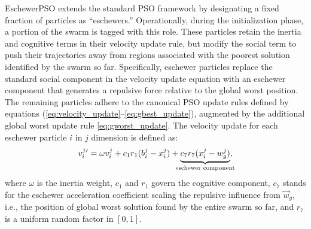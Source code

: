 {EschewerPSO extends the standard PSO framework by designating a fixed fraction of particles as ``eschewers.'' Operationally, during the initialization phase, a portion of the swarm is tagged with this role. These particles retain the inertia and cognitive terms in their velocity update rule, but modify the social term to push their trajectories away from regions associated with the poorest solution identified by the swarm so far.
Specifically, eschewer particles replace the standard social component in the velocity update equation with an eschewer component that generates a repulsive force relative to the global worst position. The remaining particles adhere to the canonical PSO update rules defined by equations (\ref{eq:velocity_update}–\ref{eq:gbest_update}), augmented by the additional global worst update rule \eqref{eq:gworst_update}. 
The velocity update for each eschewer particle $i$ in $j$ dimension is defined as:
\begin{equation}\label{eq:velocity_update_eschewer}
v_{i}^{j}{}' = \omega v_{i}^{j} +
c_1 r_1 (b_{i}^{j} - x_{i}^{j}) +
\underbrace{c_7 r_7 (x_{i}^{j} - w_{g}^{j})}_{\mathclap{\text{eschewer component}}},
\end{equation}
where
$\omega$ is the inertia weight, $c_1$ and $r_1$ govern the cognitive component, $c_7$ stands for the eschewer acceleration coefficient scaling the repulsive influence from $\vec{w}_g$, i.e., the position of global worst solution found by the entire swarm so far, and $r_7$ is a uniform random factor in $[0, 1]$.



\begin{figure}[H]
    \centering
\end{figure}}
